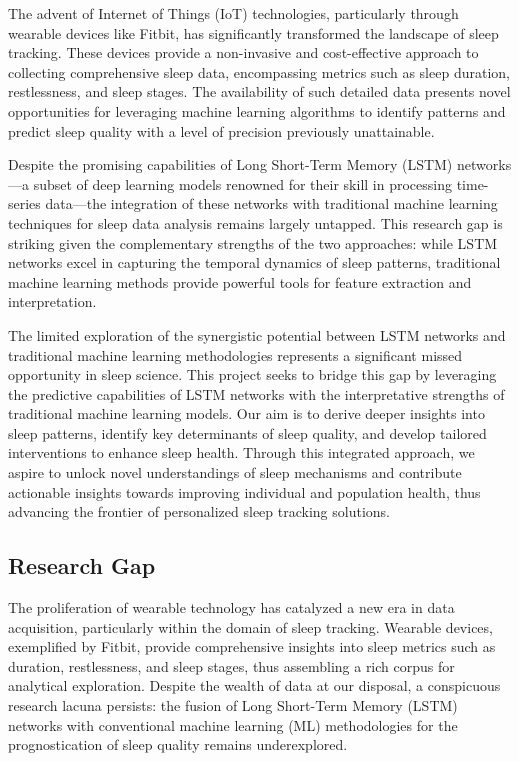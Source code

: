 \documentclass[10pt]{extarticle}
\begin{document}
The advent of Internet of Things (IoT) technologies, particularly through wearable devices like Fitbit, has significantly transformed the landscape of sleep tracking. These devices provide a non-invasive and cost-effective approach to collecting comprehensive sleep data, encompassing metrics such as sleep duration, restlessness, and sleep stages. The availability of such detailed data presents novel opportunities for leveraging machine learning algorithms to identify patterns and predict sleep quality with a level of precision previously unattainable.

Despite the promising capabilities of Long Short-Term Memory (LSTM) networks—a subset of deep learning models renowned for their skill in processing time-series data—the integration of these networks with traditional machine learning techniques for sleep data analysis remains largely untapped. This research gap is striking given the complementary strengths of the two approaches: while LSTM networks excel in capturing the temporal dynamics of sleep patterns, traditional machine learning methods provide powerful tools for feature extraction and interpretation.

The limited exploration of the synergistic potential between LSTM networks and traditional machine learning methodologies represents a significant missed opportunity in sleep science. This project seeks to bridge this gap by leveraging the predictive capabilities of LSTM networks with the interpretative strengths of traditional machine learning models. Our aim is to derive deeper insights into sleep patterns, identify key determinants of sleep quality, and develop tailored interventions to enhance sleep health. Through this integrated approach, we aspire to unlock novel understandings of sleep mechanisms and contribute actionable insights towards improving individual and population health, thus advancing the frontier of personalized sleep tracking solutions.

\subsection{Research Gap}

The proliferation of wearable technology has catalyzed a new era in data acquisition, particularly within the domain of sleep tracking. Wearable devices, exemplified by Fitbit, provide comprehensive insights into sleep metrics such as duration, restlessness, and sleep stages, thus assembling a rich corpus for analytical exploration. Despite the wealth of data at our disposal, a conspicuous research lacuna persists: the fusion of Long Short-Term Memory (LSTM) networks with conventional machine learning (ML) methodologies for the prognostication of sleep quality remains underexplored.
\end{document}
